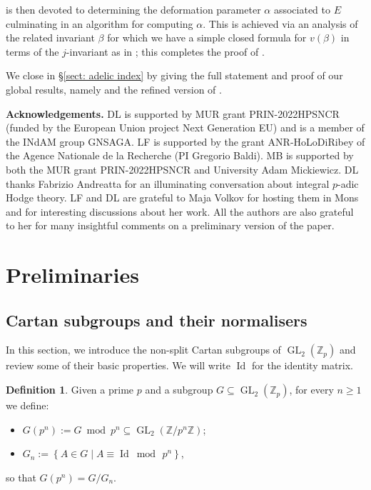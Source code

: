 \documentclass{amsart}
\newcommand{\op}[1]{\operatorname{#1}}
\theoremstyle{definition}
\newtheorem{definition}[theorem]{Definition}
\newcommand{\Z}{\mathbb{Z}}
\newcommand{\GL}{\operatorname{GL}}
\numberwithin{theorem}{section}
\numberwithin{equation}{section}
\begin{document}
 is then devoted to determining the deformation parameter $\alpha$ associated to $E$ culminating in an algorithm for computing $\alpha$. This is achieved via an analysis of the related invariant $\beta$ for which we have a simple closed formula for $v(\beta)$ in terms of the $j$-invariant as in ; this completes the proof of .

We close in \S\ref{sect: adelic index} by giving the full statement and proof of our global results, namely  and the refined version of . 

\vspace{5pt}
\noindent \textbf{Acknowledgements.}
DL is supported by MUR grant PRIN-2022HPSNCR (funded by the European Union project Next Generation EU) and is a member of the INdAM group GNSAGA. LF is supported by the grant ANR-HoLoDiRibey of the Agence Nationale de la Recherche (PI Gregorio Baldi). MB is supported by both the MUR grant PRIN-2022HPSNCR and University Adam Mickiewicz. DL thanks Fabrizio Andreatta for an illuminating conversation about integral $p$-adic Hodge theory. LF and DL are grateful to Maja Volkov for hosting them in Mons and for interesting discussions about her work. All the authors are also grateful to her for many insightful comments on a preliminary version of the paper.

\section{Preliminaries}\label{sect: Prelims}

\subsection{Cartan subgroups and their normalisers}

In this section, we introduce the non-split Cartan subgroups of $\GL_2(\Z_p)$ and review some of their basic properties. We will write $\op{Id}$ for the identity matrix.

\begin{definition}
	Given a prime $p$ and a subgroup $G \subseteq \GL_2(\Z_p)$, for every $n \ge 1$ we define:
	\begin{itemize}
		\item $G(p^n):= G \bmod {p^n} \subseteq \GL_2\left({\Z}/{p^n\Z}\right)$;
		\item $G_n := \left\lbrace A \in G \mid A \equiv \op{Id} \bmod{\, p^n} \right\rbrace$,
	\end{itemize}
    so that $G(p^n)=G/G_n$.
\end{definition}
\end{document}
